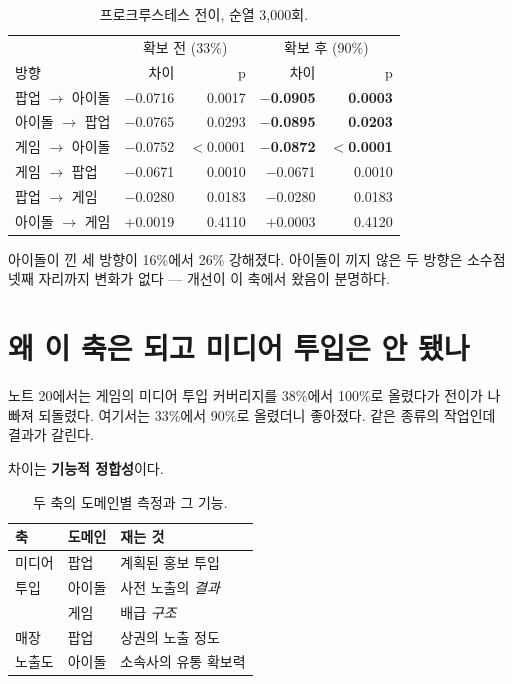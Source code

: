 \documentclass[10pt]{article}
\begin{document}
\begin{table}[t]
\centering\tsize
\caption{프로크루스테스 전이, 순열 3,000회.}
\begin{tabular}{lrrrr}
\toprule
& \multicolumn{2}{c}{확보 전 (33\%)} & \multicolumn{2}{c}{확보 후 (90\%)} \\
방향 & 차이 & p & 차이 & p \\
\midrule
팝업 $\to$ 아이돌 & $-$0.0716 & 0.0017 & \textbf{$-$0.0905} & \textbf{0.0003} \\
아이돌 $\to$ 팝업 & $-$0.0765 & 0.0293 & \textbf{$-$0.0895} & \textbf{0.0203} \\
게임 $\to$ 아이돌 & $-$0.0752 & $<$0.0001 & \textbf{$-$0.0872} & \textbf{$<$0.0001} \\
\midrule
게임 $\to$ 팝업 & $-$0.0671 & 0.0010 & $-$0.0671 & 0.0010 \\
팝업 $\to$ 게임 & $-$0.0280 & 0.0183 & $-$0.0280 & 0.0183 \\
아이돌 $\to$ 게임 & $+$0.0019 & 0.4110 & $+$0.0003 & 0.4120 \\
\bottomrule
\end{tabular}
\end{table}

아이돌이 낀 세 방향이 16\%에서 26\% 강해졌다. 아이돌이 끼지 않은 두 방향은
소수점 넷째 자리까지 변화가 없다 --- 개선이 이 축에서 왔음이 분명하다.


\section{왜 이 축은 되고 미디어 투입은 안 됐나}

노트 20에서는 게임의 미디어 투입 커버리지를 38\%에서 100\%로 올렸다가 전이가
나빠져 되돌렸다. 여기서는 33\%에서 90\%로 올렸더니 좋아졌다. 같은 종류의 작업인데
결과가 갈린다.

차이는 \textbf{기능적 정합성}이다.

\begin{table}[t]
\centering\tsize
\caption{두 축의 도메인별 측정과 그 기능.}
\begin{tabular}{lll}
\toprule
축 & 도메인 & 재는 것 \\
\midrule
미디어 & 팝업 & 계획된 홍보 투입 \\
투입 & 아이돌 & 사전 노출의 \emph{결과} \\
 & 게임 & 배급 \emph{구조} \\
\midrule
매장 & 팝업 & 상권의 노출 정도 \\
노출도 & 아이돌 & 소속사의 유통 확보력 \\
\bottomrule
\end{tabular}
\end{table}
\end{document}
